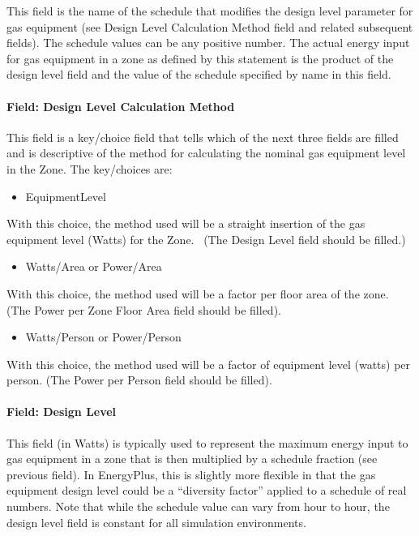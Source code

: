 This field is the name of the schedule that modifies the design level parameter for gas equipment (see Design Level Calculation Method field and related subsequent fields). The schedule values can be any positive number. The actual energy input for gas equipment in a zone as defined by this statement is the product of the design level field and the value of the schedule specified by name in this field.

\paragraph{Field: Design Level Calculation Method}\label{field-design-level-calculation-method-2}

This field is a key/choice field that tells which of the next three fields are filled and is descriptive of the method for calculating the nominal gas equipment level in the Zone. The key/choices are:

\begin{itemize}
\tightlist
\item
  EquipmentLevel
\end{itemize}

With this choice, the method used will be a straight insertion of the gas equipment level (Watts) for the Zone.~ (The Design Level field should be filled.)

\begin{itemize}
\tightlist
\item
  Watts/Area or Power/Area
\end{itemize}

With this choice, the method used will be a factor per floor area of the zone. (The Power per Zone Floor Area field should be filled).

\begin{itemize}
\tightlist
\item
  Watts/Person or Power/Person
\end{itemize}

With this choice, the method used will be a factor of equipment level (watts) per person. (The Power per Person field should be filled).

\paragraph{Field: Design Level}\label{field-design-level-1-000}

This field (in Watts) is typically used to represent the maximum energy input to gas equipment in a zone that is then multiplied by a schedule fraction (see previous field). In EnergyPlus, this is slightly more flexible in that the gas equipment design level could be a ``diversity factor'' applied to a schedule of real numbers. Note that while the schedule value can vary from hour to hour, the design level field is constant for all simulation environments.

